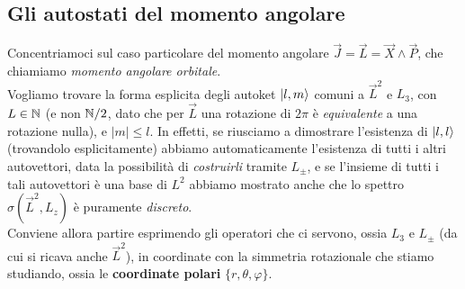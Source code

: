 \documentclass[../../FisicaTeorica.tex]{subfiles}
\begin{document}
\subsection{Gli autostati del momento angolare}
Concentriamoci sul caso particolare del momento angolare  $\vec{J}=\vec{L} = \vec{X}\land \vec{P}$, che chiamiamo \textit{momento angolare orbitale}.\\

Vogliamo trovare la forma esplicita degli autoket $\ket{l,m}$ comuni a $\vec{L}^2$ e $L_3$, con $L\in \mathbb{N}$ (e non $\mathbb{N}/2$, dato che per $\vec{L}$  una rotazione di $2\pi$ è \textit{equivalente} a una rotazione nulla), e $|m| \leq l$. In effetti, se riusciamo a dimostrare l'esistenza di $\ket{l,l}$ (trovandolo esplicitamente) abbiamo automaticamente l'esistenza di tutti i altri autovettori, data la possibilità di \textit{costruirli} tramite $L_\pm$, e se l'insieme di tutti i tali autovettori è una base di $L^2$ abbiamo mostrato anche che lo spettro $\sigma(\vec{L}^2, L_z)$ è puramente \textit{discreto}.\\

Conviene allora partire esprimendo gli operatori che ci servono, ossia $L_3$ e $L_\pm$ (da cui si ricava anche $\vec{L}^2$), in coordinate  con la simmetria rotazionale che stiamo studiando, ossia le \textbf{coordinate polari} $\{r,\theta,\varphi\}$.\\
 
\end{document}
